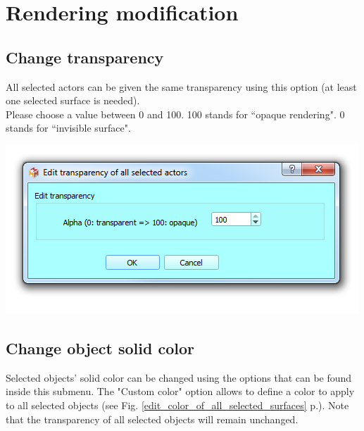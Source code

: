 \section{Rendering modification}



\subsection{Change transparency}
\noindent
\begin{minipage}{0.4\textwidth}
All selected actors can be given the same transparency using this option (at least one selected surface is needed).\\
Please choose a value between 0 and 100. 100 stands for ``opaque rendering". 0 stands for ``invisible surface".\\


\end{minipage}    
\begin{minipage}{0.6\textwidth}\centering
  \includegraphics[scale=0.5]{images/09/rendering/transparency.png}
 \end{minipage} 
\noindent





\subsection{Change object solid color}
Selected objects' solid color can be changed using the options that can be found inside this submenu. The  "Custom color" option allows to define a color to apply to all selected objects (see Fig. \ref{edit_color_of_all_selected_surfaces} p.\pageref{edit_color_of_all_selected_surfaces}). Note that the transparency of all selected objects will remain unchanged.

